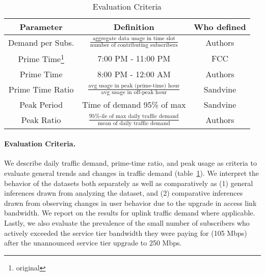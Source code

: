 \begin{table}[ht]
\small 
\begin{tabular}{c|c|c}\hline
\textbf{Parameter} & \textbf{Definition} & \textbf{Who defined}		\\\hline
Demand per Subs.& \(\frac{\text{aggregate data usage in 
time slot}}{\text{number of contributing subscribers}}\) & Authors 	\\
Prime Time\footnote{original}	& 7:00 PM - 11:00 PM		& FCC	\\
Prime Time		& 8:00 PM - 12:00 AM   		& Authors	\\
Prime Time Ratio 	& \( \frac{ \text{avg usage in peak (prime-time) 
hour}}{ \text{avg usage in off-peak hour}}\) 		& Sandvine	\\
Peak Period		& Time of demand 95\% of max    & Sandvine	\\
Peak Ratio 		& \(\frac{\text{95\%-ile of max daily 
traffic demand}}{\text{mean of daily traffic demand}}\)	& Authors 	\\\hline
\end{tabular}
\caption{Evaluation Criteria}
\label{tab:eval-criteria}
\end{table}


\paragraph{Evaluation Criteria. } We describe daily traffic demand, 
prime-time ratio, and peak usage as criteria to evaluate general trends 
and changes in traffic demand (table~\ref{tab:eval-criteria}). We interpret the 
behavior of the datasets both separately as well as comparatively as (1) 
general inferences drawn from analyzing the dataset,  and (2) comparative 
inferences drawn from observing changes in user behavior due to the upgrade in 
access link bandwidth. We report on the results for uplink traffic 
demand where applicable. Lastly, we also evaluate the prevalence of the 
small number of subscribers who actively exceeded the service tier bandwidth 
they were paying for (105 Mbps) after the unannounced service tier upgrade to 
250 Mbps.








